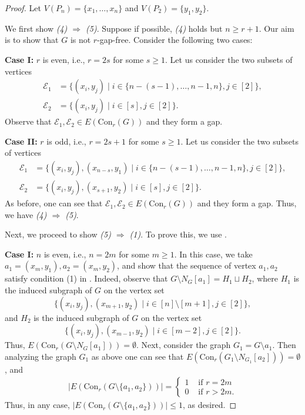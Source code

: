\documentclass[12pt,reqno]{amsart}
\theoremstyle{definition}
\newcommand{\Con}{{\mathrm{Con}}}
\def\E{\mathcal{E}}
\begin{document}
	\begin{proof}
		Let $V(P_n)=\{x_1,\ldots,x_n\}$ and $V(P_2)=\{y_1,y_2\}$.
		
		We first show \emph{(4) $\Rightarrow$ (5)}. Suppose if possible, \emph{(4)} holds but $n\ge r+1$. Our aim is to show that $G$ is not $r$-gap-free. Consider the following two cases:
		
		\noindent
		{\bf Case I:} $r$ is even, i.e., $r=2s$ for some $s\ge 1$. Let us consider the two subsets of vertices
		\begin{align*}
			\E_1&=\{(x_i,y_j)\mid i\in\{n-(s-1),\ldots,n-1,n\},j\in[2]\},\\
			\E_2&=\{(x_i,y_j)\mid i\in[s],j\in[2]\}.
		\end{align*}
		Observe that $\E_1,\E_2\in E(\Con_r(G))$ and they form a gap.
		
		\noindent
		{\bf Case II:} $r$ is odd, i.e., $r=2s+1$ for some $s\ge 1$. Let us consider the two subsets of vertices
		\begin{align*}
			\E_1&=\{(x_i,y_j),(x_{n-s},y_1)\mid i\in\{n-(s-1),\ldots,n-1,n\},j\in[2]\},\\
			\E_2&=\{(x_i,y_j),(x_{s+1},y_2)\mid i\in[s],j\in[2]\}.
		\end{align*}
		As before, one can see that $\E_1,\E_2\in E(\Con_r(G))$ and they form a gap. Thus, we have \emph{(4) $\Rightarrow$ (5)}.
		
		Next, we proceed to show \emph{(5) $\Rightarrow$ (1)}. To prove this, we use .
		
		\noindent
		{\bf Case I:} $n$ is even, i.e., $n=2m$ for some $m\ge 1$. In this case, we take $a_1=(x_m,y_1), a_2=(x_m,y_2)$, and show that the sequence of vertex $a_1,a_2$ satisfy condition (1) in . Indeed, observe that $G\setminus N_G[a_1]=H_1\sqcup H_2$, where $H_1$ is the induced subgraph of $G$ on the vertex set 
    \[
    \{(x_i,y_j),(x_{m+1},y_2)\mid i\in [n]\setminus [m+1],j\in[2]\},
    \]
    and $H_2$ is the induced subgraph of $G$ on the vertex set 
    \[
    \{(x_i,y_j),(x_{m-1},y_2)\mid i\in [m-2],j\in[2]\}.
    \]
    Thus, $E(\Con_r(G\setminus N_G[a_1]))=\emptyset$. Next, consider the graph $G_1=G\setminus a_1$. Then analyzing the graph $G_1$ as above one can see that $E(\Con_r(G_1\setminus N_{G_1}[a_2]))=\emptyset$, and
		\begin{align*}
			|E(\Con_r(G\setminus \{a_1,a_2\}))|=\begin{cases}
				1&\text{ if }r=2m\\
				0&\text{ if }r>2m.
			\end{cases}
		\end{align*}
		Thus, in any case, $|E(\Con_r(G\setminus \{a_1,a_2\}))|\le 1$, as desired. 
		

\end{proof}
\end{document}
